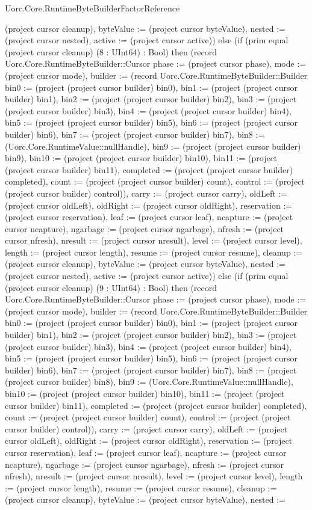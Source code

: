 \begin{lexlean}{Uorc.Core.RuntimeByteBuilderFactorReference}
\begin{semanticmodule}
{(project cursor cleanup), byteValue := (project cursor byteValue), nested := (project cursor nested), active := (project cursor active)}) else (if (prim equal (project cursor cleanup) (8 : UInt64) : Bool) then (record Uorc.Core.RuntimeByteBuilder::Cursor {phase := (project cursor phase), mode := (project cursor mode), builder := (record Uorc.Core.RuntimeByteBuilder::Builder {bin0 := (project (project cursor builder) bin0), bin1 := (project (project cursor builder) bin1), bin2 := (project (project cursor builder) bin2), bin3 := (project (project cursor builder) bin3), bin4 := (project (project cursor builder) bin4), bin5 := (project (project cursor builder) bin5), bin6 := (project (project cursor builder) bin6), bin7 := (project (project cursor builder) bin7), bin8 := (Uorc.Core.RuntimeValue::nullHandle), bin9 := (project (project cursor builder) bin9), bin10 := (project (project cursor builder) bin10), bin11 := (project (project cursor builder) bin11), completed := (project (project cursor builder) completed), count := (project (project cursor builder) count), control := (project (project cursor builder) control)}), carry := (project cursor carry), oldLeft := (project cursor oldLeft), oldRight := (project cursor oldRight), reservation := (project cursor reservation), leaf := (project cursor leaf), ncapture := (project cursor ncapture), ngarbage := (project cursor ngarbage), nfresh := (project cursor nfresh), nresult := (project cursor nresult), level := (project cursor level), length := (project cursor length), resume := (project cursor resume), cleanup := (project cursor cleanup), byteValue := (project cursor byteValue), nested := (project cursor nested), active := (project cursor active)}) else (if (prim equal (project cursor cleanup) (9 : UInt64) : Bool) then (record Uorc.Core.RuntimeByteBuilder::Cursor {phase := (project cursor phase), mode := (project cursor mode), builder := (record Uorc.Core.RuntimeByteBuilder::Builder {bin0 := (project (project cursor builder) bin0), bin1 := (project (project cursor builder) bin1), bin2 := (project (project cursor builder) bin2), bin3 := (project (project cursor builder) bin3), bin4 := (project (project cursor builder) bin4), bin5 := (project (project cursor builder) bin5), bin6 := (project (project cursor builder) bin6), bin7 := (project (project cursor builder) bin7), bin8 := (project (project cursor builder) bin8), bin9 := (Uorc.Core.RuntimeValue::nullHandle), bin10 := (project (project cursor builder) bin10), bin11 := (project (project cursor builder) bin11), completed := (project (project cursor builder) completed), count := (project (project cursor builder) count), control := (project (project cursor builder) control)}), carry := (project cursor carry), oldLeft := (project cursor oldLeft), oldRight := (project cursor oldRight), reservation := (project cursor reservation), leaf := (project cursor leaf), ncapture := (project cursor ncapture), ngarbage := (project cursor ngarbage), nfresh := (project cursor nfresh), nresult := (project cursor nresult), level := (project cursor level), length := (project cursor length), resume := (project cursor resume), cleanup := (project cursor cleanup), byteValue := (project cursor byteValue), nested := }
\end{semanticmodule}
\end{lexlean}
